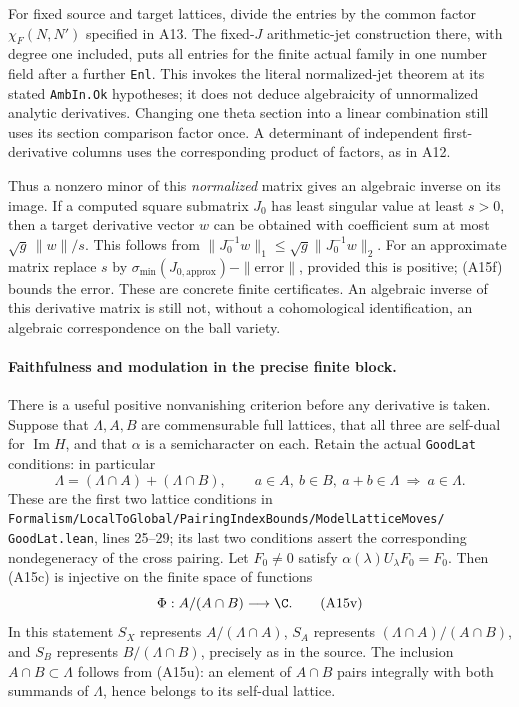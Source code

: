 For fixed source and target lattices, divide the entries by the
common factor $\chi_F(N,N')$ specified in A13.  The fixed-$J$
arithmetic-jet construction there, with degree one included, puts
all entries for the finite actual family in one number field after
a further \texttt{Enl}.  This invokes the literal normalized-jet
theorem at its stated \texttt{AmbIn.Ok} hypotheses; it does not
deduce algebraicity of unnormalized analytic derivatives.
Changing one theta section into a linear combination still uses
its section comparison factor once.  A determinant of independent
first-derivative columns uses the corresponding product of factors,
as in A12.

Thus a nonzero minor of this \emph{normalized} matrix gives an
algebraic inverse on its image.  If a computed square submatrix
$J_0$ has least singular value at least $s>0$, then a target
derivative vector $w$ can be obtained with coefficient sum at most
$\sqrt g\,\|w\|/s$.  This follows from
$\|J_0^{-1}w\|_1\leq\sqrt g\|J_0^{-1}w\|_2$.
For an approximate matrix replace $s$ by
$\sigma_{\min}(J_{0,\mathrm{approx}})-\|\mathrm{error}\|$, provided
this is positive; (A15f) bounds the error.
These are concrete finite certificates.  An algebraic inverse of
this derivative matrix is still not, without a cohomological
identification, an algebraic correspondence on the ball variety.

\paragraph{Faithfulness and modulation in the precise finite block.}
There is a useful positive nonvanishing criterion before any derivative
is taken.  Suppose that $\Lambda,A,B$ are commensurable full lattices,
that all three are self-dual for $\operatorname{Im}H$, and that
$\alpha$ is a semicharacter on each.  Retain the actual
\texttt{GoodLat} conditions: in particular
\[
 \Lambda=(\Lambda\cap A)+(\Lambda\cap B),\qquad
 a\in A,\ b\in B,\ a+b\in\Lambda\ \Longrightarrow\ a\in\Lambda.
 \tag{A15u}
\]
These are the first two lattice conditions in
\texttt{Formalism/LocalToGlobal/PairingIndexBounds/ModelLatticeMoves/}
\texttt{GoodLat.lean}, lines 25--29; its last two conditions assert
the corresponding nondegeneracy of the cross pairing.
Let $F_0\ne0$ satisfy $\alpha(\lambda)U_\lambda F_0=F_0$.
Then (A15c) is injective on the finite space of functions
\[
                 \Phi:A/(A\cap B)\longrightarrow\C.
 \tag{A15v}
\]
In this statement $S_X$ represents $A/(\Lambda\cap A)$,
$S_A$ represents $(\Lambda\cap A)/(A\cap B)$, and $S_B$
represents $B/(\Lambda\cap B)$, precisely as in the source.
The inclusion $A\cap B\subset\Lambda$ follows from (A15u): an
element of $A\cap B$ pairs integrally with both summands of
$\Lambda$, hence belongs to its self-dual lattice.

